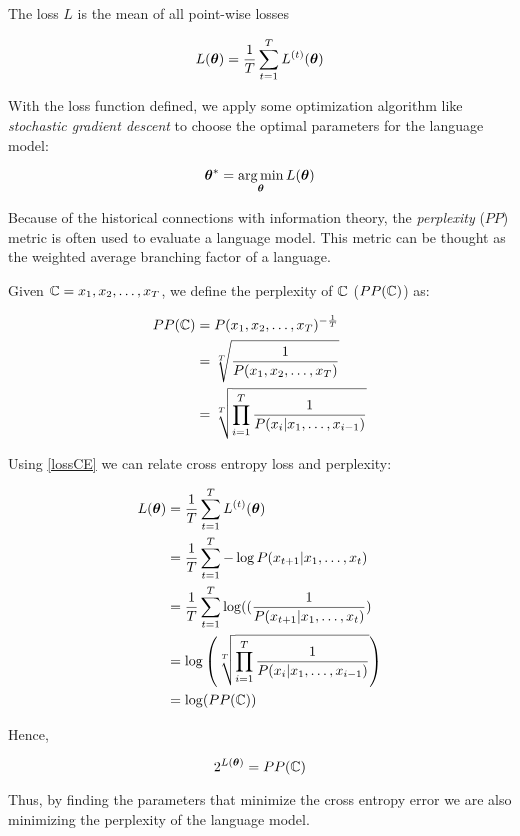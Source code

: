 The loss $L$ is the mean of all point-wise losses

\begin{equation}
L(\bm{\theta})=\frac{1}{T}\sum_{t=1}^{T}L^{(t)}(\bm{\theta})
\end{equation}

With the loss function defined, we apply some optimization algorithm like \textit{stochastic gradient descent} to choose the optimal parameters for the language model:

\begin{equation}
\bm{\theta}^{*} = \operatorname*{arg\,min}_{\bm{\theta}} L(\bm{\theta})
\end{equation}

Because of the historical connections with information theory, the \textit{perplexity} ($PP$) metric is often used to evaluate a language model. This metric can be thought as the weighted average branching factor of a language.

Given $\mathbb{C} = x_1, x_2, \dots, x_T$, we define the perplexity of $\mathbb{C}$ ($PP(\mathbb{C})$) as:

\begin{align}
PP(\mathbb{C}) &= P(x_1, x_2, \dots, x_T)^{-\frac{1}{T}}\\
      &= \sqrt[T]{\frac{1}{P(x_1, x_2, \dots, x_T)}}\\
      &= \sqrt[T]{\prod_{i=1}^{T}\frac{1}{P(x_i \vert x_1,\dots, x_{i-1})}}
\end{align}

Using \ref{lossCE} we can relate cross entropy loss and perplexity:

\begin{align}
        L(\bm{\theta}) &=\frac{1}{T} \sum_{t=1}^{T} L^{(t)}(\bm{\theta})\\
          &=\frac{1}{T} \sum_{t=1}^{T} - \log P(x_{t+1}|x_{1}, \dots, x_{t})\\
          &=\frac{1}{T} \sum_{t=1}^{T} \log ((\frac{1}{P(x_{t+1}|x_{1}, \dots, x_{t})})\\
          &= \log\left( \sqrt[T]{\prod_{i=1}^{T}\frac{1}{P(x_i \vert x_1,\dots, x_{i-1})}} \right)\\
          &= \log(PP(\mathbb{C}))
\end{align}

Hence,

\begin{equation}
2^{L(\bm{\theta})} = PP(\mathbb{C})
\end{equation}

Thus, by finding the parameters that minimize the cross entropy error we are also minimizing the perplexity of the language model. 


